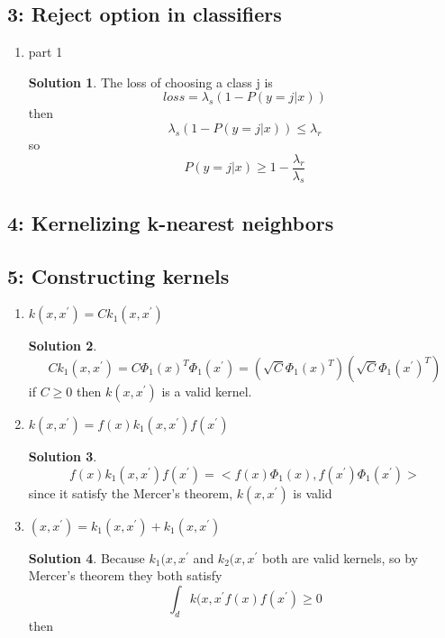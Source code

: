 \documentclass[]{book}
\theoremstyle{definition}
\newtheorem*{soln}{Solution}
\begin{document}
\subsection*{3: Reject option in classifiers  }
\begin{enumerate}
	\item part 1
	\begin{soln}
		The loss of choosing a class j is 
		$$loss = \lambda_s (1 - P(y = j | x))$$
		then
		$$\lambda_s(1 - P(y = j | x))\leq \lambda_r$$
		so
		$$ P(y = j | x)\geq 1- \frac{\lambda_r}{\lambda_s}$$
	\end{soln}
\end{enumerate}
\subsection*{4: Kernelizing k-nearest neighbors  }
\subsection*{5: Constructing kernels  }
\begin{enumerate}
	\item $k(x,x^{'}) = C k_1(x,x^{'})$
	\begin{soln}
		$$C k_1(x,x^{'}) = C \Phi_1(x)^T \Phi_1(x^{'}) = (\sqrt{C}\Phi_1(x)^T)(\sqrt{C}\Phi_1(x^{'})^T)$$
		if $C\geq0$ then $k(x,x^{'})$ is a valid kernel.
	\end{soln}
	\item $k(x,x^{'}) = f(x) k_1(x,x^{'}) f(x^{'})$
	\begin{soln}
		$$f(x) k_1(x,x^{'})f(x^{'}) = <f(x)\Phi_1(x),  f(x^{'})\Phi_1(x^{'})>$$
		since it satisfy the Mercer's theorem, $k(x,x^{'})$ is valid
	\end{soln} 
	\item $(x,x^{'}) = k_1(x,x^{'}) + k_1(x,x^{'})$
	\begin{soln}
		Because $k_1(x,x^{'}$ and $k_2(x,x^{'}$ both are valid kernels, so by Mercer's theorem they both satisfy
		$$\int_d k(x,x^{'}f(x)f(x^{'})\geq0$$
		then
	\end{soln}
\end{enumerate}
\end{document}
